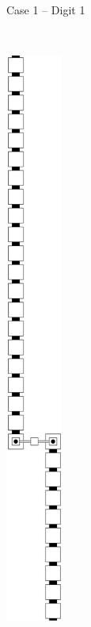\begin{enumerate}[label={--}]
\begin{figure}[h]
\begin{subfigure}[t]{0.2\textwidth}
                        \caption{\label{fig:warping/pre_warp_case1_digit1_msr} Case 1 -- Digit 1}
                    \end{subfigure}%
                    ~
                    \begin{subfigure}[t]{0.2\textwidth}
                        \centering
                        \includegraphics[width=0.2\textwidth]{warping/pre_warp_case2_digit1_msr}

\end{subfigure}
\end{figure}
\end{enumerate}
